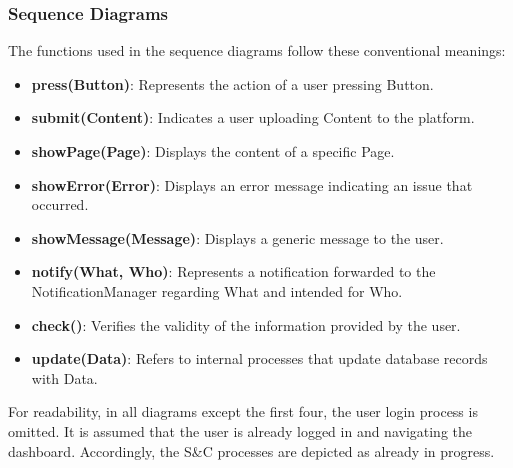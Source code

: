\subsubsection{Sequence Diagrams}
The functions used in the sequence diagrams follow these conventional meanings:
\begin{itemize}
    \item \textbf{press(Button)}: Represents the action of a user pressing Button.
    \item \textbf{submit(Content)}: Indicates a user uploading Content to the platform.
    \item \textbf{showPage(Page)}: Displays the content of a specific Page.
    \item \textbf{showError(Error)}: Displays an error message indicating an issue that occurred.
    \item \textbf{showMessage(Message)}: Displays a generic message to the user.
    \item \textbf{notify(What, Who)}: Represents a notification forwarded to the NotificationManager regarding What and intended for Who.
    \item \textbf{check()}: Verifies the validity of the information provided by the user.
    \item \textbf{update(Data)}: Refers to internal processes that update database records with Data.
\end{itemize}
For readability, in all diagrams except the first four, the user login process is omitted. It is assumed that the user is already logged in and navigating the dashboard. Accordingly, the S\&C processes are depicted as already in progress.\\

